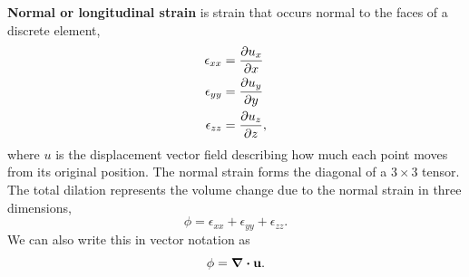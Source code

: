 {\bf Normal or longitudinal strain} is strain that occurs normal to the faces of
a discrete element,
\begin{align}
    \epsilon_{xx} & = \pdv{u_x}{x} \\
    \epsilon_{yy} & = \pdv{u_y}{y} \\
    \epsilon_{zz} & = \pdv{u_z}{z},
\end{align}
where $u$ is the displacement vector field describing how much each point moves
from its original position.  The normal strain forms the diagonal of a $3 \times
3$ tensor.  The total dilation represents the volume change due to the normal
strain in three dimensions,
\begin{equation}
    \phi = \epsilon_{xx} + \epsilon_{yy} + \epsilon_{zz}.
    \label{eq:dilation}
\end{equation}
We can also write this in vector notation as
\begin{equation}
    \phi = \div \vb{u}.
\end{equation}


